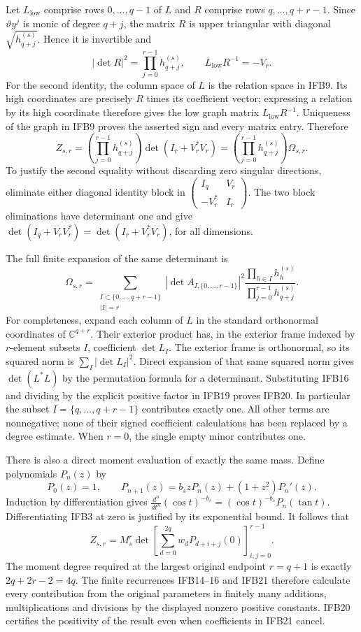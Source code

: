 \documentclass[11pt,a4paper]{article}
\begin{document}
Let $L_{\mathrm{low}}$ comprise rows $0,\ldots,q-1$ of $L$ and
$R$ comprise rows $q,\ldots,q+r-1$. Since $\vartheta y^j$ is
monic of degree $q+j$, the matrix $R$ is upper triangular with
diagonal $\sqrt{h_{q+j}^{(s)}}$. Hence it is invertible and
\[
 |\det R|^2=\prod_{j=0}^{r-1}h_{q+j}^{(s)},\qquad
 L_{\mathrm{low}}R^{-1}=-V_r.
 \tag{IFB18}
\]
For the second identity, the column space of $L$ is the relation
space in IFB9. Its high coordinates are precisely $R$ times its
coefficient vector; expressing a relation by its high coordinate
therefore gives the low graph matrix $L_{\mathrm{low}}R^{-1}$.
Uniqueness of the graph in IFB9 proves the asserted sign and every
matrix entry. Therefore
\[
 Z_{s,r}
 =\left(\prod_{j=0}^{r-1}h_{q+j}^{(s)}\right)
       \det(I_r+V_r^*V_r)
 =\left(\prod_{j=0}^{r-1}h_{q+j}^{(s)}\right)\Omega_{s,r}.
 \tag{IFB19}
\]
To justify the second equality without discarding zero singular
directions, eliminate either diagonal identity block in
$\left(\begin{smallmatrix}I_q&V_r\\-V_r^*&I_r\end{smallmatrix}\right)$.
The two block eliminations have determinant one and give
$\det(I_q+V_rV_r^*)=\det(I_r+V_r^*V_r)$, for all dimensions.

The full finite expansion of the same determinant is
\[
 \boxed{\displaystyle
 \Omega_{s,r}=
 \sum_{\substack{I\subset\{0,\ldots,q+r-1\}\\|I|=r}}
 |\det A_{I,\{0,\ldots,r-1\}}|^2
 \frac{\prod_{h\in I}h_h^{(s)}}
      {\prod_{j=0}^{r-1}h_{q+j}^{(s)}}.}
 \tag{IFB20}
\]
For completeness, expand each column of $L$ in the standard
orthonormal coordinates of $\mathbb C^{q+r}$. Their exterior
product has, in the exterior frame indexed by $r$-element subsets
$I$, coefficient $\det L_I$. The exterior frame is orthonormal,
so its squared norm is $\sum_I|\det L_I|^2$. Direct expansion of
that same squared norm gives $\det(L^*L)$ by the permutation
formula for a determinant. Substituting IFB16 and dividing by the
explicit positive factor in IFB19 proves IFB20. In particular the
subset $I=\{q,\ldots,q+r-1\}$ contributes exactly one. All other
terms are nonnegative; none of their signed coefficient calculations
has been replaced by a degree estimate. When $r=0$, the single
empty minor contributes one.

There is also a direct moment evaluation of exactly the same mass.
Define polynomials $P_n(z)$ by
\[
 P_0(z)=1,\qquad
 P_{n+1}(z)=b_szP_n(z)+(1+z^2)P_n'(z).
\]
Induction by differentiation gives
$\frac{d^n}{dt^n}(\cos t)^{-b_s}
=(\cos t)^{-b_s}P_n(\tan t)$. Differentiating IFB3 at zero
is justified by its exponential bound. It follows that
\[
 \boxed{\displaystyle
 Z_{s,r}=M_s^r\det\left[
       \sum_{d=0}^{2q}w_dP_{d+i+j}(0)
                          \right]_{i,j=0}^{r-1}.}
 \tag{IFB21}
\]
The moment degree required at the largest original endpoint $r=q+1$
is exactly $2q+2r-2=4q$. The finite recurrences IFB14--16 and
IFB21 therefore calculate every contribution from the original
parameters in finitely many additions, multiplications and divisions
by the displayed nonzero positive constants. IFB20 certifies the
positivity of the result even when coefficients in IFB21 cancel.
\end{document}
